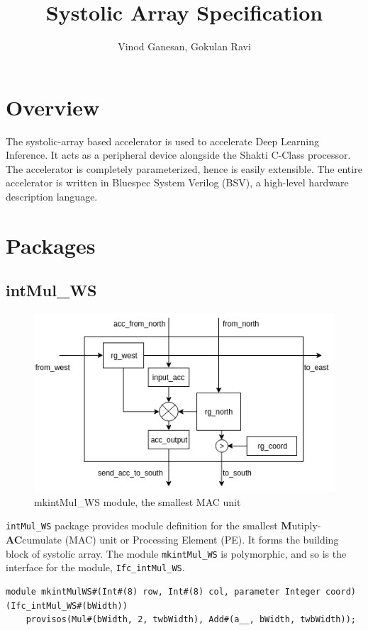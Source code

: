 \documentclass{article}
\title{Systolic Array Specification}
\author{Vinod Ganesan, Gokulan Ravi}
\begin{document}
\maketitle
\section{Overview}
The systolic-array based accelerator is used to accelerate Deep Learning Inference. It acts as a peripheral device alongside the Shakti C-Class processor. The accelerator is completely parameterized, hence is easily extensible. The entire accelerator is written in Bluespec System Verilog (BSV), a high-level hardware description language.

\section{Packages}

\subsection{intMul\_WS}

\begin{figure}
  \centering
  \includegraphics[scale=0.7]{./images/mkintMul_WS.png}
  \caption{mkintMul\_WS module, the smallest MAC unit}
  \label{fig:fig1}
\end{figure}

  \texttt{intMul\_WS} package provides module definition for the smallest \textbf{M}utiply-\textbf{AC}cumulate (MAC) unit or Processing Element (PE). It forms the building block of systolic array. The module \texttt{mkintMul\_WS} is polymorphic, and so is the interface for the module, \texttt{Ifc\_intMul\_WS}. 

\begin{verbatim}
module mkintMulWS#(Int#(8) row, Int#(8) col, parameter Integer coord)(Ifc_intMul_WS#(bWidth))
    provisos(Mul#(bWidth, 2, twbWidth), Add#(a__, bWidth, twbWidth));
\end{verbatim}
\end{document}
